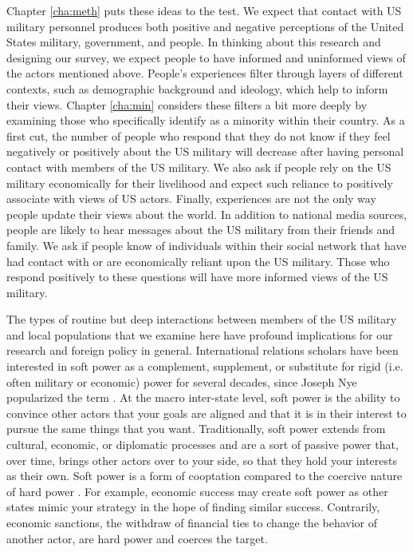 {	Chapter \ref{cha:meth} puts these ideas to the test. We expect that contact with US military personnel produces both positive and negative perceptions of the United States military, government, and people. In thinking about this research and designing our survey, we expect people to have informed and uninformed views of the actors mentioned above. People's experiences filter through layers of different contexts, such as demographic background and ideology, which help to inform their views. Chapter \ref{cha:min} considers these filters a bit more deeply by examining those who specifically identify as a minority within their country. As a first cut, the number of people who respond that they do not know if they feel negatively or positively about the US military will decrease after having personal contact with members of the US military. We also ask if people rely on the US military economically for their livelihood and expect such reliance to positively associate with views of US actors. Finally, experiences are not the only way people update their views about the world. In addition to national media sources, people are likely to hear messages about the US military from their friends and family. We ask if people know of individuals within their social network that have had contact with or are economically reliant upon the US military. Those who respond positively to these questions will have more informed views of the US military. 
	
	The types of routine but deep interactions between members of the US military and local populations that we examine here have profound implications for our research and foreign policy in general. International relations scholars have been interested in soft power as a complement, supplement, or substitute for rigid (i.e. often military or economic) power for several decades, since Joseph Nye popularized the term \cite{Nye1990}. At the macro inter-state level, soft power is the ability to convince other actors that your goals are aligned and that it is in their interest to pursue the same things that you want. Traditionally, soft power extends from cultural, economic, or diplomatic processes and are a sort of passive power that, over time, brings other actors over to your side, so that they hold your interests as their own. Soft power is a form of cooptation compared to the coercive nature of hard power \cite{Nye2004}. For example, economic success may create soft power as other states mimic your strategy in the hope of finding similar success. Contrarily, economic sanctions, the withdraw of financial ties to change the behavior of another actor, are hard power and coerces the target. 
	
}
